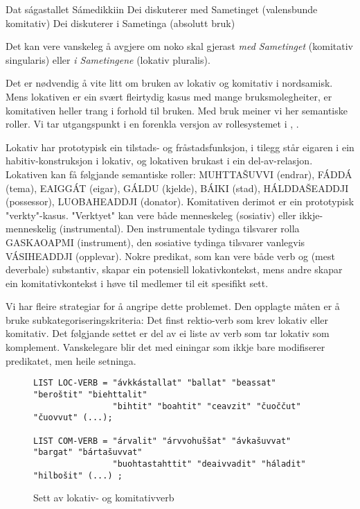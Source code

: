 \documentclass[a4paper,norsk]{article}
\begin{document}
\begin{example}\label{saga}
\glll Dat ságastallet Sámedikkiin 
      Dei diskuterer {med Sametinget (valensbunde komitativ)}
      Dei diskuterer {i Sametinga (absolutt bruk)} 
\gln      
\glend
\end{example}


Det kan vere vanskeleg å avgjere om noko skal gjerast \textit{med Sametinget} (komitativ singularis) eller \textit{i Sametingene} (lokativ pluralis). %

Det er nødvendig å vite litt om bruken av lokativ og komitativ i nordsamisk. Mens lokativen er ein svært fleirtydig kasus med mange bruksmolegheiter, er komitativen heller trang i forhold til bruken. Med bruk meiner vi her semantiske roller. Vi tar utgangspunkt i en forenkla versjon av rollesystemet i \citet{Sammallahti02},\citet{Sammallahti05} %
.

Lokativ har prototypisk ein tilstads- og fråstadsfunksjon, i tilegg står eigaren i ein habitiv-konstruksjon i lokativ, og lokativen brukast i ein del-av-relasjon. Lokativen kan få følgjande semantiske roller: MUHTTAŠUVVI (endrar), FÁDDÁ (tema), EAIGGÁT (eigar), GÁLDU (kjelde), BÁIKI (stad), HÁLDDAŠEADDJI (possessor), LUOBAHEADDJI (donator). Komitativen derimot er ein prototypisk "verkty"-kasus. "Verktyet" kan vere både menneskeleg (sosiativ) eller ikkje-menneskelig (instrumental). Den instrumentale tydinga tilsvarer rolla GASKAOAPMI (instrument), den sosiative tydinga tilsvarer vanlegvis VÁSIHEADDJI (opplevar).
Nokre predikat, som kan vere både verb og (mest deverbale) substantiv, skapar ein potensiell lokativkontekst, mens andre skapar ein komitativkontekst i høve til medlemer til eit spesifikt sett.

Vi har fleire strategiar for å angripe dette problemet. Den opplagte måten er å bruke subkategoriseringskriteria: Det finst rektio-verb som krev lokativ eller komitativ. Det følgjande settet er del av ei liste av verb som tar lokativ som komplement. Vanskelegare blir det med einingar som ikkje bare modifiserer predikatet, men heile setninga. %

\begin{figure}[htbp]
\begin{center}
\begin{verbatim}
LIST LOC-VERB = "ávkkástallat" "ballat" "beassat" "beroštit" "biehttalit"
			 	"bihtit" "boahtit" "ceavzit" "čuoččut" "čuovvut" (...);
			 	
LIST COM-VERB = "árvalit" "árvvohuššat" "ávkašuvvat" "bargat" "bártašuvvat"
 				"buohtastahttit" "deaivvadit" "háladit" "hilbošit" (...) ;
\end{verbatim}
\caption{Sett av lokativ- og komitativverb}
\label{loccomverb}
\end{center}
\end{figure}
\end{document}
